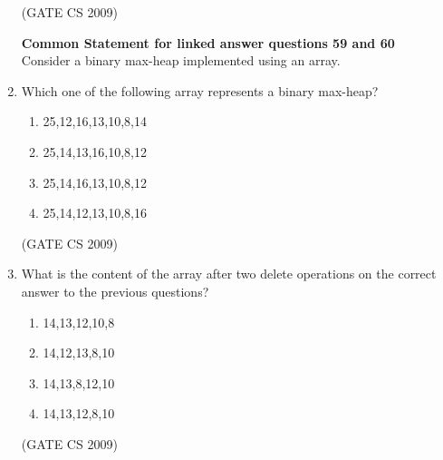 \documentclass[a4paper, 11pt]{article}
\begin{document}
\begin{enumerate}
    \hfill (GATE CS 2009)
    
    {\Large \textbf{Common Statement for linked answer questions 59 and 60}} \\    
    Consider a binary max-heap implemented using an array.
    \item Which one of the following array represents a binary max-heap?
        \begin{enumerate} 
            \item {25,12,16,13,10,8,14}
            \item {25,14,13,16,10,8,12}
            \item {25,14,16,13,10,8,12}
            \item {25,14,12,13,10,8,16}
        \end{enumerate}
    \hfill (GATE CS 2009)
    \item What is the content of the array after two delete operations on the correct answer to the previous questions?
        \begin{enumerate} 
            \item {14,13,12,10,8}
            \item {14,12,13,8,10}
            \item {14,13,8,12,10}
            \item {14,13,12,8,10}
        \end{enumerate}
    \hfill (GATE CS 2009)
    

    
\end{enumerate}
\end{document}
